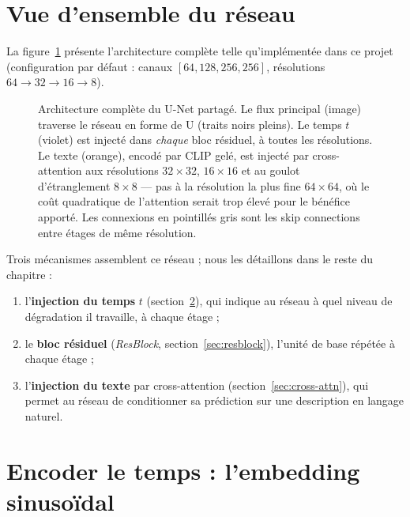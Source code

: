 \section{Vue d'ensemble du réseau}

La figure~\ref{fig:unet-architecture} présente l'architecture complète telle qu'implémentée dans ce
projet (configuration par défaut : canaux $[64, 128, 256, 256]$, résolutions $64 \to 32 \to 16 \to 8$).

\begin{figure}[p]
\centering
\resizebox{\textwidth}{!}{}
\caption{Architecture complète du U-Net partagé. Le flux principal (image) traverse le réseau en
forme de U (traits noirs pleins). Le temps $t$ (violet) est injecté dans \emph{chaque} bloc résiduel,
à toutes les résolutions. Le texte (orange), encodé par CLIP gelé, est injecté par cross-attention aux
résolutions $32\times32$, $16\times16$ et au goulot d'étranglement $8\times8$ — pas à la résolution la
plus fine $64\times64$, où le coût quadratique de l'attention serait trop élevé pour le bénéfice
apporté. Les connexions en pointillés gris sont les skip connections entre étages de même résolution.}
\label{fig:unet-architecture}
\end{figure}

Trois mécanismes assemblent ce réseau ; nous les détaillons dans le reste du chapitre :
\begin{enumerate}
    \item l'\textbf{injection du temps} $t$ (section~\ref{sec:time-embed}), qui indique au réseau à
    quel niveau de dégradation il travaille, à chaque étage ;
    \item le \textbf{bloc résiduel} (\emph{ResBlock}, section~\ref{sec:resblock}), l'unité de base
    répétée à chaque étage ;
    \item l'\textbf{injection du texte} par cross-attention (section~\ref{sec:cross-attn}), qui permet
    au réseau de conditionner sa prédiction sur une description en langage naturel.
\end{enumerate}

\section{Encoder le temps : l'embedding sinusoïdal}
\label{sec:time-embed}

